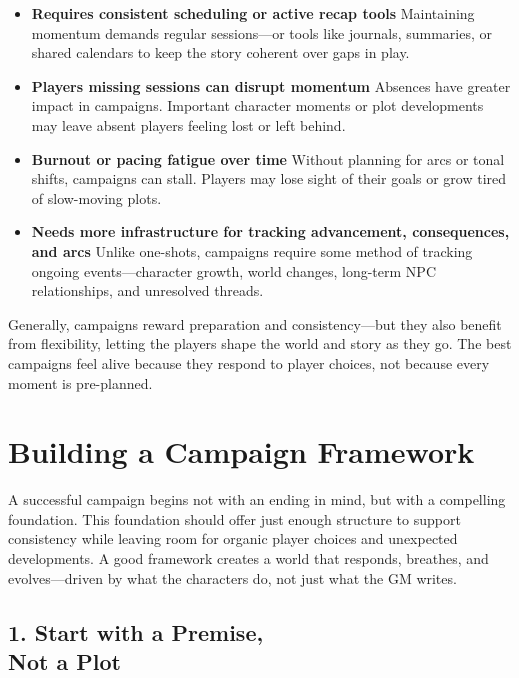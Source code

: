\begin{itemize}\raggedright
    \item \textbf{Requires consistent scheduling or active recap tools}  
    Maintaining momentum demands regular sessions—or tools like journals, summaries, or shared calendars to keep the story coherent over gaps in play.

    \item \textbf{Players missing sessions can disrupt momentum}  
    Absences have greater impact in campaigns. Important character moments or plot developments may leave absent players feeling lost or left behind.

    \item \textbf{Burnout or pacing fatigue over time}  
    Without planning for arcs or tonal shifts, campaigns can stall. Players may lose sight of their goals or grow tired of slow-moving plots.

    \item \textbf{Needs more infrastructure for tracking advancement, consequences, and arcs}  
    Unlike one-shots, campaigns require some method of tracking ongoing events—character growth, world changes, long-term NPC relationships, and unresolved threads.
\end{itemize}

Generally, campaigns reward preparation and consistency—but they also benefit from flexibility, letting the players shape the world and story as they go. The best campaigns feel alive because they respond to player choices, not because every moment is pre-planned.





\section{Building a Campaign Framework}

A successful campaign begins not with an ending in mind, but with a compelling foundation. This foundation should offer just enough structure to support consistency while leaving room for organic player choices and unexpected developments. A good framework creates a world that responds, breathes, and evolves—driven by what the characters do, not just what the GM writes.

\subsection*{1. Start with a Premise,\\ Not a Plot}

